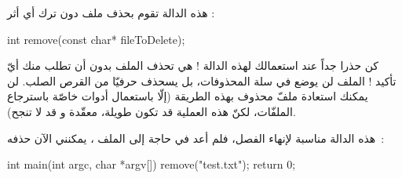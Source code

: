 هذه الدالة تقوم بحذف ملف دون ترك أي أثر :

\begin{Csource}
int remove(const char* fileToDelete);
\end{Csource}

\begin{critical}
  كن حذرا جداً عند استعمالك لهذه الدالة ! هي تحذف الملف بدون أن تطلب منك أيّ تأكيد ! الملف لن يوضع في سلة المحذوفات، بل يسحذف حرفيّا من القرص الصلب. لن يمكنك استعادة ملفّ محذوف بهذه الطريقة (إلّا باستعمال أدوات خاصّة باسترجاع الملفّات، لكنّ هذه العملية قد تكون طويلة، معقّدة و قد لا تنجح).
\end{critical}

هذه الدالة مناسبة لإنهاء الفصل، فلم أعد في حاجة إلى الملف
،
يمكنني الآن حذفه~:

\begin{Csource}
int main(int argc, char *argv[])
{
    remove("test.txt");
    return 0;
}
\end{Csource}
